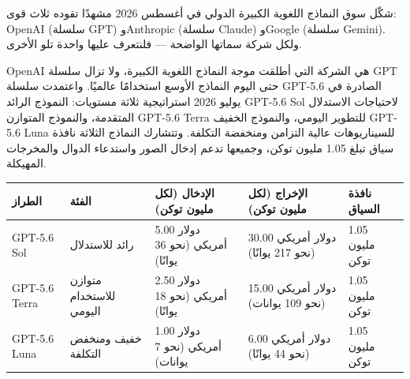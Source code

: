 


شكّل سوق النماذج اللغوية الكبيرة الدولي في أغسطس 2026 مشهدًا تقوده ثلاث قوى: OpenAI (سلسلة GPT) وAnthropic (سلسلة Claude) وGoogle (سلسلة Gemini). ولكل شركة سماتها الواضحة — فلنتعرف عليها واحدة تلو الأخرى.


OpenAI هي الشركة التي أطلقت موجة النماذج اللغوية الكبيرة، ولا تزال سلسلة GPT حتى اليوم النماذج الأوسع استخدامًا عالميًا. واعتمدت سلسلة GPT-5.6 الصادرة في يوليو 2026 استراتيجية ثلاثة مستويات: النموذج الرائد GPT-5.6 Sol لاحتياجات الاستدلال المتقدمة، والنموذج المتوازن GPT-5.6 Terra للتطوير اليومي، والنموذج الخفيف GPT-5.6 Luna للسيناريوهات عالية التزامن ومنخفضة التكلفة. وتتشارك النماذج الثلاثة نافذة سياق تبلغ 1.05 مليون توكن، وجميعها تدعم إدخال الصور واستدعاء الدوال والمخرجات المهيكلة.

\begin{center}
\begin{tabularx}{\linewidth}{|X|X|X|X|X|}
\hline
\textbf{الطراز} & \textbf{الفئة} & \textbf{الإدخال (لكل مليون توكن)} & \textbf{الإخراج (لكل مليون توكن)} & \textbf{نافذة السياق} \tabularnewline
\hline
GPT-5.6 Sol & رائد للاستدلال & 5.00 دولار أمريكي (نحو 36 يوانًا) & 30.00 دولار أمريكي (نحو 217 يوانًا) & 1.05 مليون توكن \tabularnewline
GPT-5.6 Terra & متوازن للاستخدام اليومي & 2.50 دولار أمريكي (نحو 18 يوانًا) & 15.00 دولار أمريكي (نحو 109 يوانات) & 1.05 مليون توكن \tabularnewline
GPT-5.6 Luna & خفيف ومنخفض التكلفة & 1.00 دولار أمريكي (نحو 7 يوانات) & 6.00 دولار أمريكي (نحو 44 يوانًا) & 1.05 مليون توكن \tabularnewline
\hline
\end{tabularx}
\end{center}

